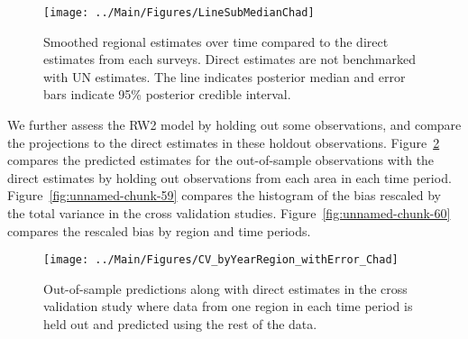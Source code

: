 \documentclass[12pt]{article}\usepackage[]{graphicx}\usepackage[]{color}
\newenvironment{knitrout}{}{} %
\begin{document}
\begin{knitrout}
\color{fgcolor}\begin{figure}[bht]

{\centering \texttt{[image: ../Main/Figures/LineSubMedianChad]} 

}

\caption[Smoothed regional estimates over time compared to the direct estimates from each surveys]{Smoothed regional estimates over time compared to the direct estimates from each surveys. Direct estimates are not benchmarked with UN estimates. The line indicates posterior median and error bars indicate 95\% posterior credible interval.}\label{fig:unnamed-chunk-57}
\end{figure}


\end{knitrout}
We further assess the RW2 model by holding out some observations, and compare the projections to the direct estimates in these holdout observations. Figure~\ref{fig:unnamed-chunk-58} compares the predicted estimates for the out-of-sample observations  with the direct estimates by holding out observations from each area in each time period.  Figure~\ref{fig:unnamed-chunk-59} compares the histogram of the bias rescaled by the total variance in the cross validation studies. Figure~\ref{fig:unnamed-chunk-60} compares the rescaled bias by region and time periods.



 
\begin{knitrout}
\color{fgcolor}\begin{figure}[bht]

{\centering \texttt{[image: ../Main/Figures/CV\_byYearRegion\_withError\_Chad]} 

}

\caption[Out-of-sample predictions along with direct estimates in the cross validation study where data from one region in each time period is held out and predicted using the rest of the data]{Out-of-sample predictions along with direct estimates in the cross validation study where data from one region in each time period is held out and predicted using the rest of the data.}\label{fig:unnamed-chunk-58}
\end{figure}


\end{knitrout}
\end{document}
